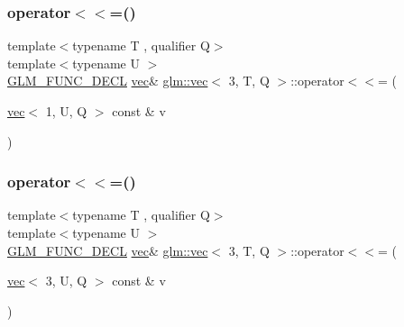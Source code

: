 \mbox{\label{structglm_1_1vec_3_013_00_01_t_00_01_q_01_4_a1325fb6cc79d8e3676e9b2be79c20df3}} 
\subsubsection{\texorpdfstring{operator$<$$<$=()}{operator<<=()}\hspace{0.1cm}{\footnotesize\ttfamily [2/6]}}
{\footnotesize\ttfamily template$<$typename T , qualifier Q$>$ \\
template$<$typename U $>$ \\
\hyperlink{setup_8hpp_ab2d052de21a70539923e9bcbf6e83a51}{G\+L\+M\+\_\+\+F\+U\+N\+C\+\_\+\+D\+E\+CL} \hyperlink{structglm_1_1vec}{vec}\& \hyperlink{structglm_1_1vec}{glm\+::vec}$<$ 3, T, Q $>$\+::operator$<$$<$= (\begin{DoxyParamCaption}\item[{\hyperlink{structglm_1_1vec}{vec}$<$ 1, U, Q $>$ const \&}]{v }\end{DoxyParamCaption})}

\mbox{\label{structglm_1_1vec_3_013_00_01_t_00_01_q_01_4_aad0c7ea72dfec6224b1a5cabeea950fb}} 
\subsubsection{\texorpdfstring{operator$<$$<$=()}{operator<<=()}\hspace{0.1cm}{\footnotesize\ttfamily [3/6]}}
{\footnotesize\ttfamily template$<$typename T , qualifier Q$>$ \\
template$<$typename U $>$ \\
\hyperlink{setup_8hpp_ab2d052de21a70539923e9bcbf6e83a51}{G\+L\+M\+\_\+\+F\+U\+N\+C\+\_\+\+D\+E\+CL} \hyperlink{structglm_1_1vec}{vec}\& \hyperlink{structglm_1_1vec}{glm\+::vec}$<$ 3, T, Q $>$\+::operator$<$$<$= (\begin{DoxyParamCaption}\item[{\hyperlink{structglm_1_1vec}{vec}$<$ 3, U, Q $>$ const \&}]{v }\end{DoxyParamCaption})}

